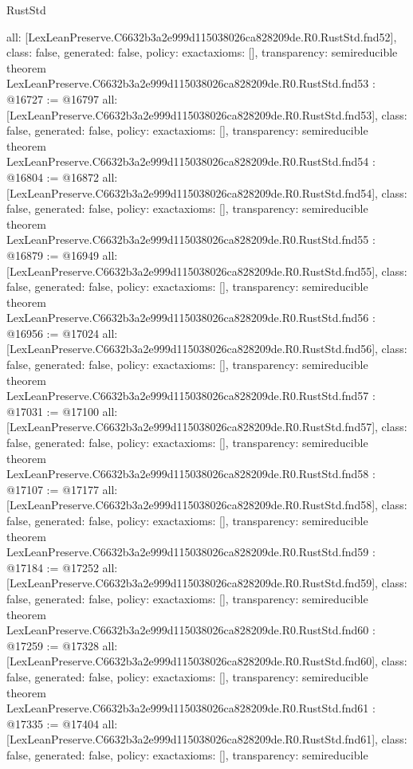 \begin{lexlean}{RustStd}
\begin{coremodule}
{  all: [LexLeanPreserve.C6632b3a2e999d115038026ca828209de.R0.RustStd.fnd52],
  class: false,
  generated: false,
  policy: exact{axioms: []},
  transparency: semireducible
}
theorem LexLeanPreserve.C6632b3a2e999d115038026ca828209de.R0.RustStd.fnd53 : @16727 := @16797 {
  all: [LexLeanPreserve.C6632b3a2e999d115038026ca828209de.R0.RustStd.fnd53],
  class: false,
  generated: false,
  policy: exact{axioms: []},
  transparency: semireducible
}
theorem LexLeanPreserve.C6632b3a2e999d115038026ca828209de.R0.RustStd.fnd54 : @16804 := @16872 {
  all: [LexLeanPreserve.C6632b3a2e999d115038026ca828209de.R0.RustStd.fnd54],
  class: false,
  generated: false,
  policy: exact{axioms: []},
  transparency: semireducible
}
theorem LexLeanPreserve.C6632b3a2e999d115038026ca828209de.R0.RustStd.fnd55 : @16879 := @16949 {
  all: [LexLeanPreserve.C6632b3a2e999d115038026ca828209de.R0.RustStd.fnd55],
  class: false,
  generated: false,
  policy: exact{axioms: []},
  transparency: semireducible
}
theorem LexLeanPreserve.C6632b3a2e999d115038026ca828209de.R0.RustStd.fnd56 : @16956 := @17024 {
  all: [LexLeanPreserve.C6632b3a2e999d115038026ca828209de.R0.RustStd.fnd56],
  class: false,
  generated: false,
  policy: exact{axioms: []},
  transparency: semireducible
}
theorem LexLeanPreserve.C6632b3a2e999d115038026ca828209de.R0.RustStd.fnd57 : @17031 := @17100 {
  all: [LexLeanPreserve.C6632b3a2e999d115038026ca828209de.R0.RustStd.fnd57],
  class: false,
  generated: false,
  policy: exact{axioms: []},
  transparency: semireducible
}
theorem LexLeanPreserve.C6632b3a2e999d115038026ca828209de.R0.RustStd.fnd58 : @17107 := @17177 {
  all: [LexLeanPreserve.C6632b3a2e999d115038026ca828209de.R0.RustStd.fnd58],
  class: false,
  generated: false,
  policy: exact{axioms: []},
  transparency: semireducible
}
theorem LexLeanPreserve.C6632b3a2e999d115038026ca828209de.R0.RustStd.fnd59 : @17184 := @17252 {
  all: [LexLeanPreserve.C6632b3a2e999d115038026ca828209de.R0.RustStd.fnd59],
  class: false,
  generated: false,
  policy: exact{axioms: []},
  transparency: semireducible
}
theorem LexLeanPreserve.C6632b3a2e999d115038026ca828209de.R0.RustStd.fnd60 : @17259 := @17328 {
  all: [LexLeanPreserve.C6632b3a2e999d115038026ca828209de.R0.RustStd.fnd60],
  class: false,
  generated: false,
  policy: exact{axioms: []},
  transparency: semireducible
}
theorem LexLeanPreserve.C6632b3a2e999d115038026ca828209de.R0.RustStd.fnd61 : @17335 := @17404 {
  all: [LexLeanPreserve.C6632b3a2e999d115038026ca828209de.R0.RustStd.fnd61],
  class: false,
  generated: false,
  policy: exact{axioms: []},
  transparency: semireducible
}
\end{coremodule}
\end{lexlean}
